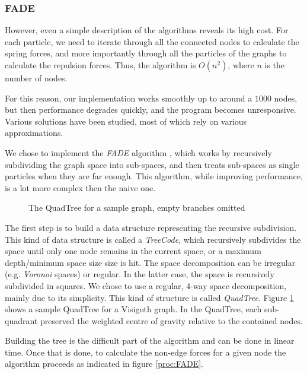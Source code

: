 \documentclass[a4paper,11pt,titlepage]{article}
\begin{document}
\subsubsection{FADE}

However, even a simple description of the algorithms reveals its high
cost. For each particle, we need to iterate through all the connected
nodes to calculate the spring forces, and more importantly through all
the particles of the graphs to calculate the repulsion forces. Thus,
the algorithm is \(O(n^2)\), where \(n\) is the number of nodes.

For this reason, our implementation works smoothly up to around a
\(1000\) nodes, but then performance degrades quickly, and the program
becomes unresponsive. Various solutions have been studied, most of
which rely on various approximations.

We chose to implement the \emph{FADE} algorithm \cite{fade}, which works by
recursively subdividing the graph space into sub-spaces, and then
treats sub-spaces as single particles when they are far enough. This
algorithm, while improving performance, is a lot more complex then the
naive one.

\begin{figure}
  \centering
  \hspace{10pt}
  \caption{The QuadTree for a sample graph, empty branches omitted}
  \label{fig:quadtree}
\end{figure}

The first step is to build a data structure representing the recursive
subdivision. This kind of data structure is called a \emph{TreeCode},
which recursively subdivides the space until only one node remains in
the current space, or a maximum depth/minimum space size size is
hit. The space decomposition can be irregular (e.g. \emph{Voronoi}
spaces) or regular. In the latter case, the space is recursively
subdivided in squares. We chose to use a regular, 4-way space
decomposition, mainly due to its simplicity. This kind of structure is
called \emph{QuadTree}. Figure \ref{fig:quadtree} shows a sample
QuadTree for a Visigoth graph. In the QuadTree, each sub-quadrant
preserved the weighted centre of gravity relative to the contained
nodes.

Building the tree is the difficult part of the algorithm and can be
done in linear time. Once that is done, to calculate the non-edge
forces for a given node the algorithm proceeds as indicated in figure
\ref{proc:FADE}.
\end{document}
